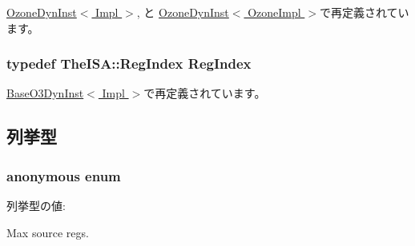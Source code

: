 \hyperlink{classOzoneDynInst_a184cb829e22cc656acb41864f68f51ea}{OzoneDynInst$<$ Impl $>$}, と \hyperlink{classOzoneDynInst_a184cb829e22cc656acb41864f68f51ea}{OzoneDynInst$<$ OzoneImpl $>$}で再定義されています。\hypertarget{classBaseDynInst_a36d25e03e43fa3bb4c5482cbefe5e0fb}{
\subsubsection[{RegIndex}]{\setlength{\rightskip}{0pt plus 5cm}typedef TheISA::RegIndex {\bf RegIndex}}}
\label{classBaseDynInst_a36d25e03e43fa3bb4c5482cbefe5e0fb}


\hyperlink{classBaseO3DynInst_a36d25e03e43fa3bb4c5482cbefe5e0fb}{BaseO3DynInst$<$ Impl $>$}で再定義されています。

\subsection{列挙型}
\hypertarget{classBaseDynInst_ae4d5251432e1a9e6803c0240cc492e18}{
\subsubsection[{"@25}]{\setlength{\rightskip}{0pt plus 5cm}anonymous enum}}
\label{classBaseDynInst_ae4d5251432e1a9e6803c0240cc492e18}
\begin{Desc}
\item[列挙型の値: ]\par
\begin{description}
\item[{\em 
\hypertarget{classBaseDynInst_ae4d5251432e1a9e6803c0240cc492e18a17b78fe104e3bf28fca535a040514084}{
MaxInstSrcRegs}
\label{classBaseDynInst_ae4d5251432e1a9e6803c0240cc492e18a17b78fe104e3bf28fca535a040514084}
}]\item[{\em 
\hypertarget{classBaseDynInst_ae4d5251432e1a9e6803c0240cc492e18a6a2e9b17a83d01eb4ee6bbdd739be9eb}{
MaxInstDestRegs}
\label{classBaseDynInst_ae4d5251432e1a9e6803c0240cc492e18a6a2e9b17a83d01eb4ee6bbdd739be9eb}
}]Max source regs. \end{description}
\end{Desc}




